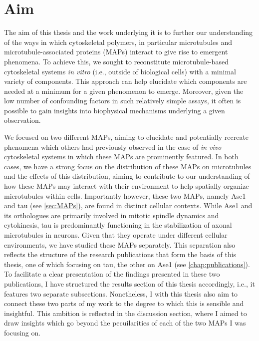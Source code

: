 \chapter{Aim}
The aim of this thesis and the work underlying it is to further our understanding of the ways in which cytoskeletal polymers, in particular microtubules and microtubule-associated proteins (MAPs) interact to give rise to emergent phenomena. To achieve this, we sought to reconstitute microtubule-based cytoskeletal systems \textit{in vitro} (i.e., outside of biological cells) with a minimal variety of components. This approach can help elucidate which components are needed at a minimum for a given phenomenon to emerge. Moreover, given the low number of confounding factors in such relatively simple assays, it often is possible to gain insights into biophysical mechanisms underlying a given observation. \par
We focused on two different MAPs, aiming to elucidate and potentially recreate phenomena which others had previously observed in the case of \textit{in vivo} cytoskeletal systems in which these MAPs are prominently featured. In both cases, we have a strong focus on the distribution of these MAPs on microtubules and the effects of this distribution, aiming to contribute to our understanding of how these MAPs may interact with their environment to help spatially organize microtubules within cells. Importantly however, these two MAPs, namely Ase1 and tau (see \autoref{sec:MAPs}), are found in distinct cellular contexts. While Ase1 and its orthologues are primarily involved in mitotic spindle dynamics and cytokinesis, tau is predominantly functioning in the stabilization of axonal microtubules in neurons. Given that they operate under different cellular environments, we have studied these MAPs separately. This separation also reflects the structure of the research publications that form the basis of this thesis, one of which focusing on tau, the other on Ase1 (see \autoref{chap:publications}). To facilitate a clear presentation of the findings presented in these two publications, I have structured the results section of this thesis accordingly, i.e., it features two separate subsections. Nonetheless, I with this thesis also aim to connect these two parts of my work to the degree to which this is sensible and insightful. This ambition is reflected in the discussion section, where I aimed to draw insights which go beyond the pecuilarities of each of the two MAPs I was focusing on.